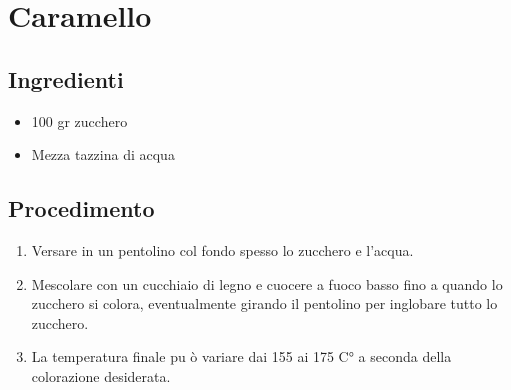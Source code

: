 \section{Caramello}
\subsection{Ingredienti}
\begin{itemize}
\item 100 gr zucchero   
\item Mezza tazzina di acqua
\end{itemize}
\subsection{Procedimento}
\begin{enumerate}
\item  Versare in un pentolino col fondo spesso lo zucchero e l'acqua.  
\item  Mescolare con un cucchiaio di legno e cuocere a fuoco basso fino a quando lo zucchero si colora, eventualmente girando il pentolino per inglobare tutto lo zucchero.  
\item  La temperatura finale pu ò variare dai 155 ai 175 C° a seconda della colorazione desiderata.
\end{enumerate}
